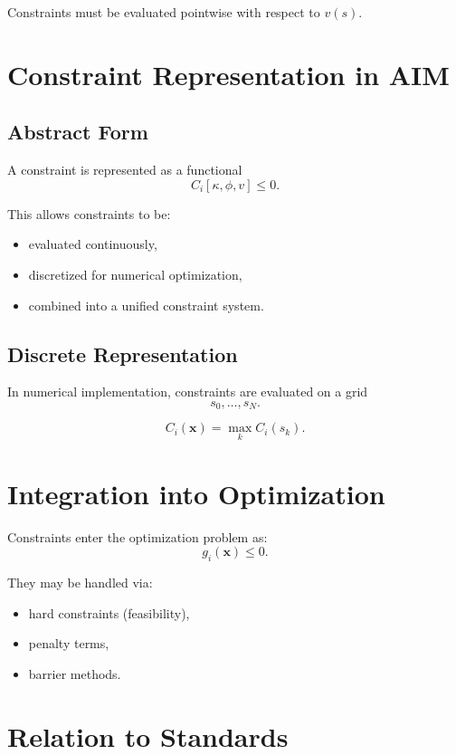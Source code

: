Constraints must be evaluated pointwise with respect to $v(s)$.


\section{Constraint Representation in AIM}

\subsection{Abstract Form}

\begin{definition}
A constraint is represented as a functional
\[
C_i[\kappa,\phi,v] \leq 0.
\]
\end{definition}

This allows constraints to be:
\begin{itemize}
\item evaluated continuously,
\item discretized for numerical optimization,
\item combined into a unified constraint system.
\end{itemize}


\subsection{Discrete Representation}

In numerical implementation, constraints are evaluated on a grid
\[
s_0, \dots, s_N.
\]

\begin{definition}
\[
C_i(\mathbf{x}) = \max_k C_i(s_k).
\]
\end{definition}


\section{Integration into Optimization}

Constraints enter the optimization problem as:
\[
g_i(\mathbf{x}) \leq 0.
\]

They may be handled via:
\begin{itemize}
\item hard constraints (feasibility),
\item penalty terms,
\item barrier methods.
\end{itemize}


\section{Relation to Standards}

